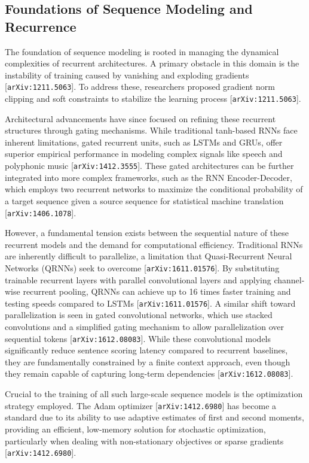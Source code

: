 \documentclass[11pt]{article}
\begin{document}
\subsection{Foundations of Sequence Modeling and Recurrence}

The foundation of sequence modeling is rooted in managing the dynamical complexities of recurrent architectures. A primary obstacle in this domain is the instability of training caused by vanishing and exploding gradients [\texttt{arXiv:1211.5063}]. To address these, researchers proposed gradient norm clipping and soft constraints to stabilize the learning process [\texttt{arXiv:1211.5063}].

Architectural advancements have since focused on refining these recurrent structures through gating mechanisms. While traditional tanh-based RNNs face inherent limitations, gated recurrent units, such as LSTMs and GRUs, offer superior empirical performance in modeling complex signals like speech and polyphonic music [\texttt{arXiv:1412.3555}]. These gated architectures can be further integrated into more complex frameworks, such as the RNN Encoder-Decoder, which employs two recurrent networks to maximize the conditional probability of a target sequence given a source sequence for statistical machine translation [\texttt{arXiv:1406.1078}].

However, a fundamental tension exists between the sequential nature of these recurrent models and the demand for computational efficiency. Traditional RNNs are inherently difficult to parallelize, a limitation that Quasi-Recurrent Neural Networks (QRNNs) seek to overcome [\texttt{arXiv:1611.01576}]. By substituting trainable recurrent layers with parallel convolutional layers and applying channel-wise recurrent pooling, QRNNs can achieve up to 16 times faster training and testing speeds compared to LSTMs [\texttt{arXiv:1611.01576}]. A similar shift toward parallelization is seen in gated convolutional networks, which use stacked convolutions and a simplified gating mechanism to allow parallelization over sequential tokens [\texttt{arXiv:1612.08083}]. While these convolutional models significantly reduce sentence scoring latency compared to recurrent baselines, they are fundamentally constrained by a finite context approach, even though they remain capable of capturing long-term dependencies [\texttt{arXiv:1612.08083}].

Crucial to the training of all such large-scale sequence models is the optimization strategy employed. The Adam optimizer [\texttt{arXiv:1412.6980}] has become a standard due to its ability to use adaptive estimates of first and second moments, providing an efficient, low-memory solution for stochastic optimization, particularly when dealing with non-stationary objectives or sparse gradients [\texttt{arXiv:1412.6980}].
\end{document}
